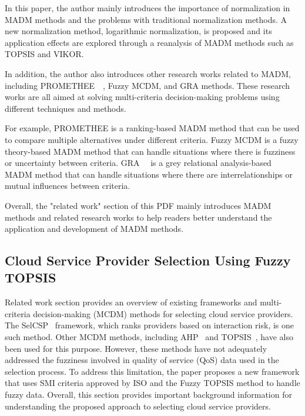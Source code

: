 \documentclass[twocolumn]{IEEEtran}
\begin{document}
In this paper, the author mainly introduces the importance of normalization in MADM methods and the problems with traditional normalization methods. A new normalization method, logarithmic normalization, is proposed and its application effects are explored through a reanalysis of MADM methods such as TOPSIS and VIKOR.

In addition, the author also introduces other research works related to MADM, including PROMETHEE~\cite{Majid2010}~\cite{Mareschal2012}, Fuzzy MCDM, and GRA methods. These research works are all aimed at solving multi-criteria decision-making problems using different techniques and methods.

For example, PROMETHEE is a ranking-based MADM method that can be used to compare multiple alternatives under different criteria. Fuzzy MCDM is a fuzzy theory-based MADM method that can handle situations where there is fuzziness or uncertainty between criteria. GRA~\cite{Peng2016} ~\cite{Moataz2016}is a grey relational analysis-based MADM method that can handle situations where there are interrelationships or mutual influences between criteria.

Overall, the "related work" section of this PDF mainly introduces MADM methods and related research works to help readers better understand the application and development of MADM methods.

\subsection{Cloud Service Provider Selection Using Fuzzy
TOPSIS}

    Related work section provides an overview of existing frameworks and multi-criteria decision-making (MCDM) methods for selecting cloud service providers. The SelCSP ~\cite{Ghosh2015}framework, which ranks providers based on interaction risk, is one such method. Other MCDM methods, including AHP~\cite{Rakesh2016} and TOPSIS~\cite{Ahmed2016}, have also been used for this purpose. However, these methods have not adequately addressed the fuzziness involved in quality of service (QoS) data used in the selection process. To address this limitation, the paper proposes a new framework that uses SMI criteria approved by ISO and the Fuzzy TOPSIS method to handle fuzzy data. Overall, this section provides important background information for understanding the proposed approach to selecting cloud service providers.









\end{document}
